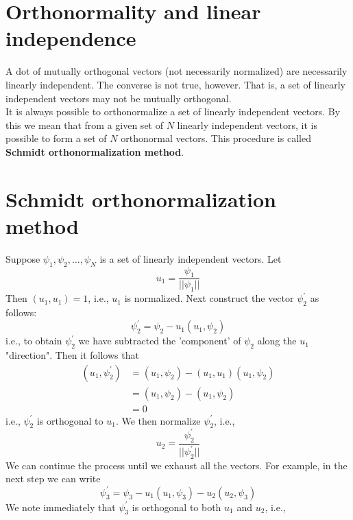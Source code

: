 \section{Orthonormality and linear independence}
A dot of mutually orthogonal vectors (not necessarily normalized) are necessarily linearly independent. The converse is not true, however. That is, a set of linearly independent vectors may not be mutually orthogonal.\\
It  is always possible to orthonormalize a set of linearly independent vectors. By this we mean that from a given set of $N$ linearly independent vectors, it is possible to form a set of $N$ orthonormal vectors. This procedure is called \textbf{Schmidt orthonormalization method}.

\section{Schmidt orthonormalization method}
Suppose $\psi_1, \psi_2, \ldots, \psi_N$ is a set of linearly independent vectors. Let
\begin{equation}\label{eqn:2.72}
u_1 = \frac{\psi_1}{||\psi_1||}
\end{equation}
Then $(u_1, u_1) = 1$, i.e., $u_1$ is normalized. Next construct the vector $\psi_2^\prime$ as follows:
\begin{equation}\label{eqn:2.73}
\psi_2^\prime = \psi_2 - u_1(u_1, \psi_2)
\end{equation}
i.e., to obtain $\psi_2^\prime$ we have subtracted the 'component' of $\psi_2$ along the $u_1$ "direction". Then it follows that
\begin{eqnarray}\label{eqn:2.74-2.76}
	(u_1, \psi_2^\prime) &= (u_1, \psi_2) - (u_1, u_1)(u_1, \psi_2) \\
	&= (u_1, \psi_2) - (u_1, \psi_2) \\
	&= 0
\end{eqnarray}
i.e., $\psi_2^\prime$ is orthogonal to $u_1$. We then normalize $\psi_2^\prime$, i.e.,
\begin{equation}\label{eqn:2.77}
u_2 = \frac{\psi_2^\prime}{||\psi_2^\prime ||}
\end{equation}
We can continue the process until we exhaust all the vectors. For example, in the next step we can write
\begin{equation}\label{eqn:2.78}
\psi_3^\prime = \psi_3 - u_1 (u_1, \psi_3) - u_2 (u_2, \psi_3)
\end{equation}
We note immediately that $\psi_3^\prime$ is orthogonal to both $u_1$ and $u_2$, i.e.,
